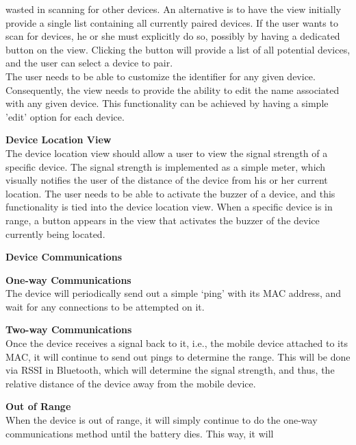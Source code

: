 \documentclass[12pt]{article}
\begin{document}
\begin{packed_enum}
\begin{packed_enum}
\begin{packed_enum}
        wasted in scanning for other devices. An alternative is to have the view initially provide a single list
        containing all currently paired devices. If the user wants to scan for devices, he or she must
        explicitly do so, possibly by having a dedicated button on the view. Clicking the button will provide a
        list of all potential devices, and the user can select a device to pair. \\
        The user needs to be able to customize the identifier for any given device. Consequently, the view needs
        to provide the ability to edit the name associated with any given device. This functionality can be
        achieved by having a simple 'edit' option for each device.
        \item \textbf{Device Location View} \\
        The device location view should allow a user to view the signal strength of a specific device. The
        signal strength is implemented as a simple meter, which visually notifies the user of the distance of
        the device from his or her current location. The user needs to be able to activate the buzzer of a
        device, and this functionality is tied into the device location view. When a specific device is in
        range, a button appears in the view that activates the buzzer of the device currently being located.
      \end{packed_enum}
      \item \textbf{Device Communications}
      \begin{packed_enum}
        \item \textbf{One-way Communications} \\
        The device will periodically send out a simple `ping' with its MAC address, and wait for any connections
        to be attempted on it. 
        \item \textbf{Two-way Communications} \\
        Once the device receives a signal back to it, i.e., the mobile device attached to its MAC, it will 
        continue to send out pings to determine the range. This will be done via RSSI in Bluetooth, which will
        determine the signal strength, and thus, the relative distance of the device away from the mobile
        device. 
        \item \textbf{Out of Range} \\
        When the device is out of range, it will simply continue to do the one-way communications method until the battery dies. This way, it will

\end{packed_enum}
\end{packed_enum}
\end{packed_enum}
\end{document}

